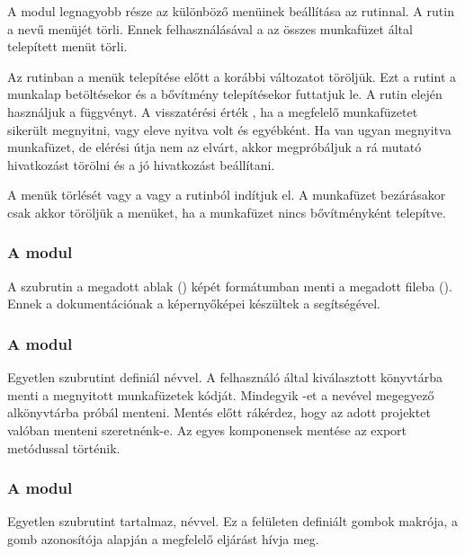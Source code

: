 A modul legnagyobb része az  különböző menüinek beállítása az
 rutinnal. A  rutin a
   nevű menüjét törli. Ennek 
felhasználásával a  az összes munkafüzet által
telepített menüt törli. 

Az  rutinban a menük telepítése
előtt a korábbi változatot töröljük. Ezt a rutint a 
munkalap betöltésekor és a bővítmény telepítésekor futtatjuk le. A
rutin elején használjuk 
a  függvényt. A visszatérési érték , ha a
megfelelő  munkafüzetet 
sikerült megnyitni, vagy eleve nyitva volt és 
egyébként. Ha van ugyan megnyitva 
 munkafüzet, de elérési útja nem az elvárt, akkor
megpróbáljuk a rá mutató hivatkozást törölni és a jó hivatkozást
beállítani.


A menük törlését vagy a  vagy a
 rutinból indítjuk el. A munkafüzet bezárásakor csak akkor töröljük a menüket, ha a  munkafüzet
nincs bővítményként telepítve. 

\subsubsection{A  modul}
A  szubrutin a megadott ablak () képét
 formátumban menti a megadott 
fileba (). Ennek a dokumentációnak a képernyőképei
készültek a segítségével. 

\subsubsection{A  modul}

Egyetlen szubrutint definiál  névvel. A felhasználó
által kiválasztott könyvtárba 
menti a megnyitott munkafüzetek  kódját. Mindegyik
-et a nevével megegyező alkönyvtárba próbál
menteni. Mentés előtt rákérdez, hogy az adott projektet 
valóban menteni szeretnénk-e. Az egyes  komponensek mentése
az export metódussal történik.

\subsubsection{A  modul}

Egyetlen szubrutint tartalmaz,  névvel. Ez a
 felületen definiált gombok makrója, a gomb azonosítója
alapján a megfelelő eljárást hívja meg.

